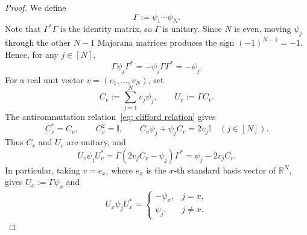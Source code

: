 \documentclass[../CLT_SYK.tex]{subfiles}
\begin{document}
\begin{proof}
We define 
\[
  \Gamma
  := 
  \psi_1\cdots\psi_N.
\]
Note that $\Gamma^*\Gamma$ is {the} identity {matrix}, so $\Gamma$ is unitary. Since $N$ is even, moving $\psi_j$ through the other $N-1$ Majorana
{matrices}  produces the sign $(-1)^{N-1}=-1$.  Hence, for any $j\in[N],$
\[
  \Gamma\psi_j\Gamma^*=  -\psi_j \Gamma \Gamma^* =-\psi_j.
\]
{For a real unit vector $v=(v_1,\ldots,v_N)$, set
\[
  C_v:=\sum_{j=1}^N v_j\psi_j,
  \qquad U_v:=\Gamma C_v.
\]
The anticommutation relation~\eqref{eq: clifford relation} gives
\[
  C_v^*=C_v,\qquad C_v^2=\mathbb I,\qquad
  C_v\psi_j+\psi_jC_v=2v_j\mathbb I\quad(j\in[N]).
\]
Thus $C_v$ and $U_v$ are unitary, and
\begin{equation}\label{eq:reflection-conjugation}
  U_v\psi_jU_v^*
  =\Gamma(2v_jC_v-\psi_j)\Gamma^*
  =\psi_j-2v_jC_v.
\end{equation}
In particular, taking $v=e_x$, where $e_x$ is the $x$-th
standard basis vector of $\mathbb R^N$, gives
$U_x:=\Gamma\psi_x$ and} 
\begin{align}\label{eq: conjugation rule}
      U_x\psi_jU_x^*
  =
  \begin{cases}
    -\psi_x,&j=x,\\
    \psi_j,&j\neq x.
  \end{cases}
\end{align}




\end{proof}
\end{document}
